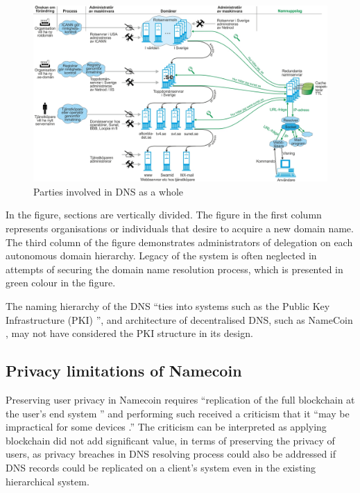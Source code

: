 \begin{figure}[h!]
    \begin{center}
    \includegraphics*[width=1\columnwidth]{img/DNS-maskinvara}
    \end{center}
    \caption{Parties involved in DNS as a whole \cite{SUNET-DNS}}
    \label{dnsactors}
\end{figure}

In the figure, sections are vertically divided.
The figure in the first column represents organisations or individuals that desire to acquire a new domain name.
The third column of the figure demonstrates administrators of delegation on each autonomous domain hierarchy.
Legacy of the system is often neglected in attempts of securing the domain name resolution process, which is presented in green colour in the figure. 

The naming hierarchy of the DNS ``ties into systems such as the Public Key Infrastructure (PKI) \cite{akamai-dns-architecture}'', and architecture of decentralised DNS, such as NameCoin \cite{loibl2014namecoin}, may not have considered the PKI structure in its design.

\subsection{Privacy limitations of Namecoin}
Preserving user privacy in Namecoin requires ``replication of the full blockchain at the user's end system \cite{grothoff2017nsa}'' and performing such received a criticism that it ``may be impractical for some devices \cite{grothoff2017nsa}.''
The criticism can be interpreted as applying blockchain did not add significant value, in terms of preserving the privacy of users, as privacy breaches in DNS resolving process could also be addressed if DNS records could be replicated on a client's system even in the existing hierarchical system. 

